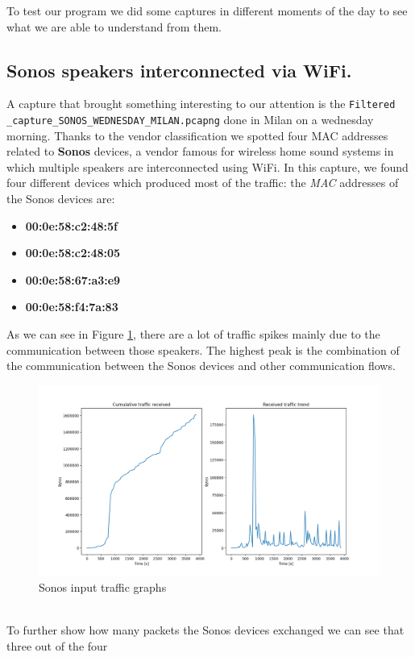 To test our program we did some captures in different moments of the day to see what we are able to 
understand from them.


\subsection{Sonos speakers interconnected via WiFi.}
 A capture that brought something interesting to our attention is the \texttt{Filtered
\_capture\_SONOS\_WEDNESDAY\_MILAN.pcapng} done in Milan on a wednesday morning. Thanks to the vendor 
classification we spotted four MAC addresses related to \textbf{Sonos} devices, a vendor famous for
wireless home sound systems in which multiple speakers are interconnected using WiFi. In this capture,
we found four different devices which produced most of the traffic: the \textit{MAC} addresses of the Sonos 
devices are:
\begin{itemize}
    \item \textbf{00:0e:58:c2:48:5f}
    \item \textbf{00:0e:58:c2:48:05}
    \item \textbf{00:0e:58:67:a3:e9}
    \item \textbf{00:0e:58:f4:7a:83}
\end{itemize}
As we can see in Figure \ref{fig:Sonos_traffic}, there are a lot of traffic spikes mainly due to the
communication between those speakers. The highest peak is the combination of the communication between
the Sonos devices and other communication flows.
\begin{figure}[h]
    \includegraphics[width=\textwidth]{Graphs/SONOS_cum_in_traffic.png}
    \caption{Sonos input traffic graphs}
    \label{fig:Sonos_traffic}
\end{figure}
\\
To further show how many packets the Sonos devices exchanged we can see that three out of the four
